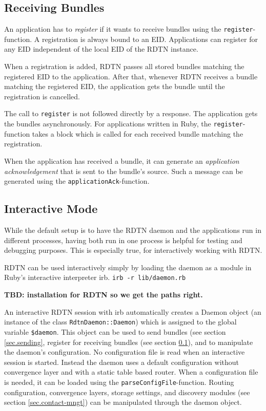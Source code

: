 \documentclass{article}
\begin{document}
\subsection{Receiving Bundles}\label{sec.receiving}

An application has to {\em register} if it wants to receive bundles using the
{\tt register}-function. A registration is always bound to an EID. Applications 
can register for any EID independent of the local EID of the RDTN instance.

When a registration is added, RDTN passes all stored bundles matching the
registered EID to the application. After that, whenever RDTN receives a bundle 
matching the registered EID, the application gets the bundle until the 
registration is cancelled.

The call to {\tt register} is not followed directly by a response. The
application gets the bundles asynchronously. For applications written in Ruby,
the {\tt register}-function takes a block which is called for each received
bundle matching the registration.

When the application has received a bundle, it can generate an {\em application
acknowledgement} that is sent to the bundle's source. Such a message can be
generated using the {\tt applicationAck}-function.

\subsection{Interactive Mode}\label{sec.interactive}

While the default setup is to have the RDTN daemon and the applications run in
different processes, having both run in one process is helpful for testing and
debugging purposes. This is especially true, for interactively working with
RDTN. 

RDTN can be used interactively simply by loading the daemon as a module in
Ruby's interactive interpreter irb. {\tt irb -r lib/daemon.rb}

{\bf TBD: installation for RDTN so we get the paths right.}

An interactive RDTN session with irb automatically creates a Daemon object (an
instance of the class {\tt RdtnDaemon::Daemon}) which is assigned to the global
variable {\tt \$daemon}. This object can be used to send bundles (see section
\ref{sec.sending}, register for receiving bundles (see section
\ref{sec.receiving}), and to manipulate the daemon's configuration. No
configuration file is read when an interactive session is started. Instead the
daemon uses a default configuration without convergence layer and with a static
table based router. When a configuration file is needed, it can be loaded
using the {\tt parseConfigFile}-function. Routing configuration, convergence
layers, storage settings, and discovery modules (see section
\ref{sec.contact-mngt}) can be manipulated through the daemon object.
\end{document}
